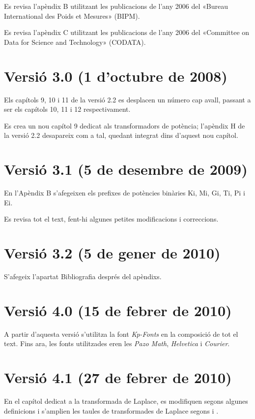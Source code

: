 Es revisa l'apèndix B utilitzant les publicacions de l'any 2006 del «Bureau
International des Poids et Mesures» (BIPM).

Es revisa l'apèndix C utilitzant les publicacions de l'any 2006 del «Committee on Data for Science and Technology» (CODATA).

\section*{Versió 3.0 (1 d'octubre de 2008)}

Els capítols 9, 10 i 11 de la versió 2.2 es desplacen un número cap
avall, passant a ser els capítols 10, 11 i 12 respectivament.

Es crea un nou capítol 9 dedicat als transformadors de potència;
l'apèndix H de la versió 2.2 desapareix com a tal, quedant integrat
dins d'aquest nou capítol.


\section*{Versió 3.1 (5 de desembre de 2009)}
En l'Apèndix B s'afegeixen els prefixes de potències binàries Ki, Mi, Gi, Ti, Pi i Ei.

Es revisa tot el text, fent-hi algunes petites modificacions i
correccions.

\section*{Versió 3.2 (5 de gener de 2010)}
S'afegeix l'apartat Bibliografia després del apèndixs.


\section*{Versió 4.0 (15 de febrer de 2010)}
A partir d'aquesta versió s'utilitza la font \emph{Kp-Fonts} en la composició de tot el text. Fins ara, les fonts utilitzades eren les \emph{Pazo Math}, \emph{Helvetica} i \emph{Courier}.


\section*{Versió 4.1 (27 de febrer de 2010)}
En el capítol dedicat a la transformada de Laplace, es modifiquen segons \cite{SCH} algunes definicions  i s'amplien les taules de transformades de Laplace segons \cite{SCH} i \cite{RASd}.


